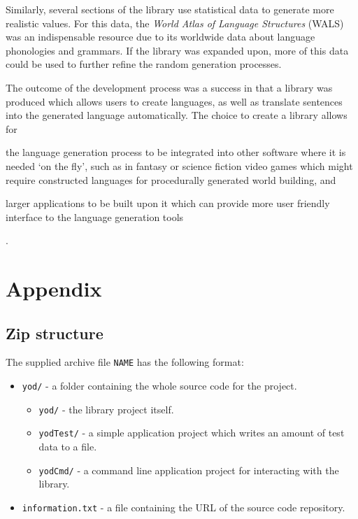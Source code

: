 \documentclass{report}
\begin{document}
	Similarly, several sections of the library use statistical data to generate more realistic values. For this data, the \textit{World Atlas of Language Structures} (\textsc{WALS}) was an indispensable resource due to its worldwide data about language phonologies and grammars. If the library was expanded upon, more of this data could be used to further refine the random generation processes.
	
	The outcome of the development process was a success in that a library was produced which allows users to create languages, as well as translate sentences into the generated language automatically. The choice to create a library allows for \begin{enumerate*}[label=\alph*)]
		\item the language generation process to be integrated into other software where it is needed `on the fly', such as in fantasy or science fiction video games which might require constructed languages for procedurally generated world building, and
		\item larger applications to be built upon it which can provide more user friendly interface to the language generation tools
	\end{enumerate*}.
   
   \printbibliography
   
   \newpage
   
   \appendix
   \chapter{Appendix}
   \section{Zip structure}
   The supplied archive file \texttt{NAME} has the following format:
   \begin{itemize}
   	\item \texttt{yod/} - a folder containing the whole source code for the project.
	   	\begin{itemize}
	   		\item \texttt{yod/} - the library project itself.
	   		\item \texttt{yodTest/} - a simple application project which writes an amount of test data to a file.
	   		\item \texttt{yodCmd/} - a command line application project for interacting with the library.
	   	\end{itemize}
   	\item \texttt{information.txt} - a file containing the URL of the source code repository.
   \end{itemize}
\end{document}
